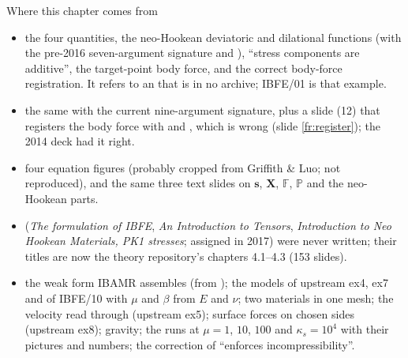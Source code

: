 \documentclass[aspectratio=169,11pt]{beamer}
\begin{document}
\begin{frame}{Where this chapter comes from}
\label{fr:sources}
\scriptsize
\begin{itemize}
  \item {} the four quantities, the neo-Hookean deviatoric and dilational functions (with the pre-2016 seven-argument signature and ), ``stress components are additive'', the target-point body force, and the correct body-force registration. It refers to an  that is in no archive; IBFE/01 is that example.
  \item {} the same with the current nine-argument signature, plus a slide (12) that registers the body force with  and , which is wrong (slide \ref{fr:register}); the 2014 deck had it right.
  \item {} four equation figures (probably cropped from Griffith \& Luo; not reproduced), and the same three text slides on $\mathbf{s}$, $\mathbf{X}$, $\mathbb{F}$, $\mathbb{P}$ and the neo-Hookean parts.
  \item {} (\emph{The formulation of IBFE}, \emph{An Introduction to Tensors}, \emph{Introduction to Neo Hookean Materials, PK1 stresses}; assigned in 2017) were never written; their titles are now the theory repository's chapters 4.1--4.3 (153 slides).
  \item {} the weak form IBAMR assembles (from ); the models of upstream ex4, ex7 and of IBFE/10 with $\mu$ and $\beta$ from $E$ and $\nu$; two materials in one mesh; the velocity read through  (upstream ex5); surface forces on chosen sides (upstream ex8); gravity; the runs at $\mu = 1$, $10$, $100$ and $\kappa_s = 10^4$ with their pictures and numbers; the correction of ``enforces incompressibility''.
\end{itemize}
\end{frame}
\end{document}
